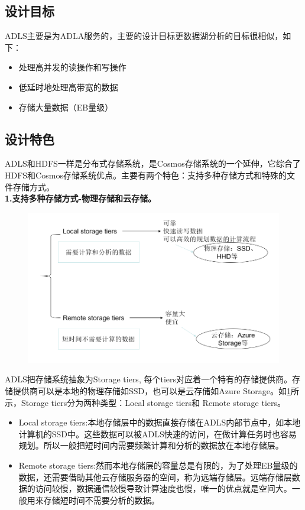 \documentclass[11pt]{article}
\begin{document}
\subsection{设计目标}
ADLS主要是为ADLA服务的，主要的设计目标更数据湖分析的目标很相似，如下：
\begin{itemize}
	\item 处理高并发的读操作和写操作
	\item 低延时地处理高带宽的数据
	\item 存储大量数据（EB量级）
\end{itemize}
\subsection{设计特色}
ADLS和HDFS一样是分布式存储系统，是Cosmos存储系统的一个延伸，它综合了HDFS和Cosmos存储系统优点。主要有两个特色：支持多种存储方式和特殊的文件存储方式。\\
\textbf{1.支持多种存储方式-物理存储和云存储。}
\begin{figure}[H]
\includegraphics[width=\linewidth]{figs/data_store.png}
\label{fig1}

\end{figure}
ADLS把存储系统抽象为Storage tiers, 每个tiers对应着一个特有的存储提供商。存储提供商可以是本地的物理存储如SSD，也可以是云存储如Azure Storage。如\ref{fig1}所示，Storage tiers分为两种类型：Local storage tiers和 Remote storage tiers。
\begin{itemize}
	\item [] Local storage tiers:本地存储层中的数据直接存储在ADLS内部节点中，如本地计算机的SSD中。这些数据可以被ADLS快速的访问，在做计算任务时也容易规划。所以一般把短时间内需要频繁计算和分析的数据放在本地存储层。
	\item [] Remote storage tiers:然而本地存储层的容量总是有限的，为了处理EB量级的数据，还需要借助其他云存储服务器的空间，称为远端存储层。远端存储层数据的访问较慢，数据通信较慢导致计算速度也慢，唯一的优点就是空间大。一般用来存储短时间不需要分析的数据。
\end{itemize}
\end{document}
